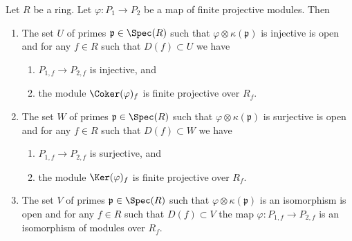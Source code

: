 \begin{lemma}
\label{lemma-cokernel-flat}
Let $R$ be a ring. Let $\varphi : P_1 \to P_2$ be a map of
finite projective modules. Then
\begin{enumerate}
\item The set $U$ of primes $\mathfrak p \in \Spec(R)$ such that
$\varphi \otimes \kappa(\mathfrak p)$ is injective is open and
for any $f\in R$ such that $D(f) \subset U$ we have
\begin{enumerate}
\item $P_{1, f} \to P_{2, f}$ is injective, and
\item the module $\Coker(\varphi)_f$ is finite projective over $R_f$.
\end{enumerate}
\item The set $W$ of primes $\mathfrak p \in \Spec(R)$ such that
$\varphi \otimes \kappa(\mathfrak p)$ is surjective is open and
for any $f\in R$ such that $D(f) \subset W$ we have
\begin{enumerate}
\item $P_{1, f} \to P_{2, f}$ is surjective, and
\item the module $\Ker(\varphi)_f$ is finite projective over $R_f$.
\end{enumerate}
\item The set $V$ of primes $\mathfrak p \in \Spec(R)$ such that
$\varphi \otimes \kappa(\mathfrak p)$ is an isomorphism is open and
for any $f\in R$ such that $D(f) \subset V$ the map
$\varphi : P_{1, f} \to P_{2, f}$ is an isomorphism of modules over $R_f$.
\end{enumerate}
\end{lemma}

